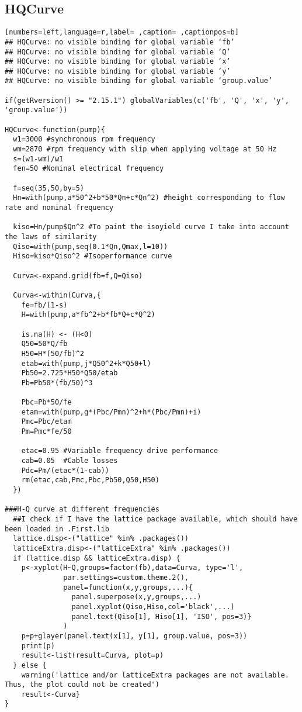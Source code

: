 \subsection{HQCurve}
\label{sec:org7524b45}
\begin{lstlisting}[numbers=left,language=r,label= ,caption= ,captionpos=b]
## HQCurve: no visible binding for global variable ‘fb’
## HQCurve: no visible binding for global variable ‘Q’
## HQCurve: no visible binding for global variable ‘x’
## HQCurve: no visible binding for global variable ‘y’
## HQCurve: no visible binding for global variable ‘group.value’

if(getRversion() >= "2.15.1") globalVariables(c('fb', 'Q', 'x', 'y', 'group.value'))

HQCurve<-function(pump){
  w1=3000 #synchronous rpm frequency
  wm=2870 #rpm frequency with slip when applying voltage at 50 Hz
  s=(w1-wm)/w1
  fen=50 #Nominal electrical frequency

  f=seq(35,50,by=5)
  Hn=with(pump,a*50^2+b*50*Qn+c*Qn^2) #height corresponding to flow rate and nominal frequency

  kiso=Hn/pump$Qn^2 #To paint the isoyield curve I take into account the laws of similarity
  Qiso=with(pump,seq(0.1*Qn,Qmax,l=10))
  Hiso=kiso*Qiso^2 #Isoperformance curve

  Curva<-expand.grid(fb=f,Q=Qiso)

  Curva<-within(Curva,{
    fe=fb/(1-s)
    H=with(pump,a*fb^2+b*fb*Q+c*Q^2)

    is.na(H) <- (H<0)
    Q50=50*Q/fb
    H50=H*(50/fb)^2
    etab=with(pump,j*Q50^2+k*Q50+l)
    Pb50=2.725*H50*Q50/etab
    Pb=Pb50*(fb/50)^3

    Pbc=Pb*50/fe
    etam=with(pump,g*(Pbc/Pmn)^2+h*(Pbc/Pmn)+i)
    Pmc=Pbc/etam
    Pm=Pmc*fe/50

    etac=0.95 #Variable frequency drive performance
    cab=0.05  #Cable losses
    Pdc=Pm/(etac*(1-cab))
    rm(etac,cab,Pmc,Pbc,Pb50,Q50,H50)
  })

###H-Q curve at different frequencies
  ##I check if I have the lattice package available, which should have been loaded in .First.lib
  lattice.disp<-("lattice" %in% .packages())
  latticeExtra.disp<-("latticeExtra" %in% .packages())
  if (lattice.disp && latticeExtra.disp) {
    p<-xyplot(H~Q,groups=factor(fb),data=Curva, type='l',
              par.settings=custom.theme.2(),
              panel=function(x,y,groups,...){
                panel.superpose(x,y,groups,...)
                panel.xyplot(Qiso,Hiso,col='black',...)
                panel.text(Qiso[1], Hiso[1], 'ISO', pos=3)}
              )
    p=p+glayer(panel.text(x[1], y[1], group.value, pos=3))
    print(p)
    result<-list(result=Curva, plot=p)
  } else {
    warning('lattice and/or latticeExtra packages are not available. Thus, the plot could not be created')
    result<-Curva}
}
\end{lstlisting}
